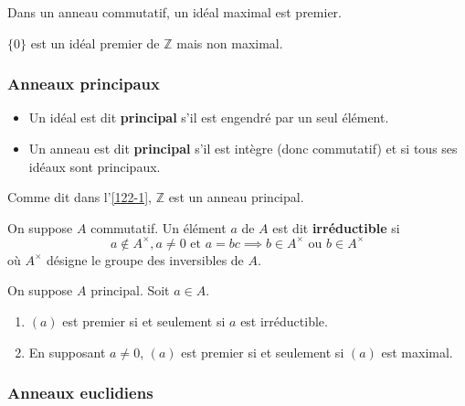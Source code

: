 	\begin{corollary}
		Dans un anneau commutatif, un idéal maximal est premier.
	\end{corollary}

	\begin{cexample}
		$\{ 0 \}$ est un idéal premier de $\mathbb{Z}$ mais non maximal.
	\end{cexample}

	\subsubsection{Anneaux principaux}


	\begin{definition}
		\begin{itemize}
			\item Un idéal est dit \textbf{principal} s'il est engendré par un seul élément.
			\item Un anneau est dit \textbf{principal} s'il est intègre (donc commutatif) et si tous ses idéaux sont principaux.
		\end{itemize}
	\end{definition}

	\begin{example}
		Comme dit dans l'\cref{122-1}, $\mathbb{Z}$ est un anneau principal.
	\end{example}


	\begin{definition}
		On suppose $A$ commutatif. Un élément $a$ de $A$ est dit \textbf{irréductible} si
		\[ a \notin A^\times, a \neq 0 \text{ et } a = bc \implies b \in A^\times \text{ ou } b \in A^\times \]
		où $A^\times$ désigne le groupe des inversibles de $A$.
	\end{definition}

	\begin{theorem}
		On suppose $A$ principal. Soit $a \in A$.
		\begin{enumerate}[label=(\roman*)]
			\item $(a)$ est premier si et seulement si $a$ est irréductible.
			\item En supposant $a \neq 0$, $(a)$ est premier si et seulement si $(a)$ est maximal.
		\end{enumerate}
	\end{theorem}

	\subsubsection{Anneaux euclidiens}

